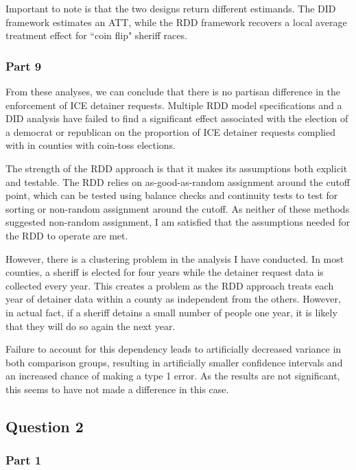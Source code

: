 \documentclass{article}\usepackage[]{graphicx}\usepackage[]{color}
\begin{document}
Important to note is that the two designs return different estimands.
The DID framework estimates an ATT, while the RDD framework recovers a local average treatment effect for ``coin flip" sheriff races.

\subsubsection{Part 9}

From these analyses, we can conclude that there is no partisan difference in the enforcement of ICE detainer requests.
Multiple RDD model specifications and a DID analysis have failed to find a significant effect associated with the election of a democrat or republican on the proportion of ICE detainer requests complied with in counties with coin-toss elections.

The strength of the RDD approach is that it makes its assumptions both explicit and testable. The RDD relies on as-good-as-random assignment around the cutoff point, which can be tested using balance checks and continuity tests to test for sorting or non-random assignment around the cutoff.
As neither of these methods suggested non-random assignment, I am satisfied that the assumptions needed for the RDD to operate are met.

However, there is a clustering problem in the analysis I have conducted.
In most counties, a sheriff is elected for four years while the detainer request data is collected every year.
This creates a problem as the RDD approach treats each year of detainer data within a county as independent from the others.
However, in actual fact, if a sheriff detains a small number of people one year, it is likely that they will do so again the next year.

Failure to account for this dependency leads to artificially decreased variance in both comparison groups, resulting in artificially smaller confidence intervals and an increased chance of making a type 1 error.
As the results are not significant, this seems to have not made a difference in this case.

\subsection{Question 2}

\subsubsection{Part 1}
\end{document}
